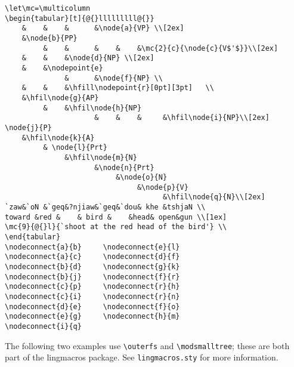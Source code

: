 \begin{verbatim}
\let\mc=\multicolumn
\begin{tabular}[t]{@{}lllllllll@{}}
    &    &    &      &\node{a}{VP} \\[2ex]
    &\node{b}{PP} 
         &    &      &    &    &\mc{2}{c}{\node{c}{V$'$}}\\[2ex]
    &    &    &\node{d}{NP} \\[2ex]
    &    &\nodepoint{e}   
              &      &\node{f}{NP} \\
    &    &    &\hfill\nodepoint{r}[0pt][3pt]   \\
    &\hfil\node{g}{AP} 
         &    &\hfil\node{h}{NP}
                     &    &    &     &\hfil\node{i}{NP}\\[2ex]
\node{j}{P}  
    &\hfil\node{k}{A}  
         & \node{l}{Prt}
              &\hfil\node{m}{N}   
                     &\node{n}{Prt} 
                          &\node{o}{N} 
                               &\node{p}{V}
                                     &\hfil\node{q}{N}\\[2ex]
`zaw&`oN &`geq&?njiaw&`geq&`dou& khe &tshjaN \\
toward &red &    & bird &    &head& open&gun \\[1ex]
\mc{9}{@{}l}{`shoot at the red head of the bird'} \\
\end{tabular}
\nodeconnect{a}{b}     \nodeconnect{e}{l}
\nodeconnect{a}{c}     \nodeconnect{d}{f}
\nodeconnect{b}{d}     \nodeconnect{g}{k}
\nodeconnect{b}{j}     \nodeconnect{f}{r}
\nodeconnect{c}{p}     \nodeconnect{r}{h}
\nodeconnect{c}{i}     \nodeconnect{r}{n}
\nodeconnect{d}{e}     \nodeconnect{f}{o}
\nodeconnect{e}{g}     \nodeconnect{h}{m}
\nodeconnect{i}{q}
\end{verbatim}
 The following two examples use \verb+\outerfs+ and
\verb+\modsmalltree+; these are both part of the lingmacros package.
See \verb+lingmacros.sty+ for more information.
